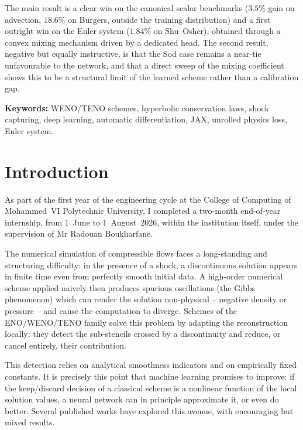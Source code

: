 \documentclass[12pt,a4paper,oneside]{report}
\begin{document}
The main result is a clear win on the canonical scalar benchmarks ($3.5\%$ gain
on advection, $18.6\%$ on Burgers, outside the training distribution) and a
first outright win on the Euler system ($1.84\%$ on Shu--Osher), obtained
through a convex mixing mechanism driven by a dedicated head. The second
result, negative but equally instructive, is that the Sod case remains a
near-tie unfavourable to the network, and that a direct sweep of the mixing
coefficient shows this to be a structural limit of the learned scheme rather
than a calibration gap.

\vspace{0.6em}
\textbf{Keywords:} WENO/TENO schemes, hyperbolic conservation laws, shock
capturing, deep learning, automatic differentiation, JAX, unrolled physics
loss, Euler system.

\tableofcontents
\listoffigures
{}
\listoftables
{}

\cleardoublepage
{}
\setcounter{page}{1}
\pagestyle{main}

\chapter*{Introduction}

As part of the first year of the engineering cycle at the College of Computing
of Mohammed~VI Polytechnic University, I completed a two-month end-of-year
internship, from 1~June to 1~August~2026, within the institution itself, under
the supervision of Mr Radouan Boukharfane.

The numerical simulation of compressible flows faces a long-standing and
structuring difficulty: in the presence of a shock, a discontinuous solution
appears in finite time even from perfectly smooth initial data. A high-order
numerical scheme applied naively then produces spurious oscillations (the Gibbs
phenomenon) which can render the solution non-physical -- negative density or
pressure -- and cause the computation to diverge. Schemes of the ENO/WENO/TENO
family solve this problem by adapting the reconstruction locally: they detect
the sub-stencils crossed by a discontinuity and reduce, or cancel entirely,
their contribution.

This detection relies on analytical smoothness indicators and on empirically
fixed constants. It is precisely this point that machine learning promises to
improve: if the keep/discard decision of a classical scheme is a nonlinear
function of the local solution values, a neural network can in principle
approximate it, or even do better. Several published works have explored this
avenue, with encouraging but mixed results.
\end{document}
